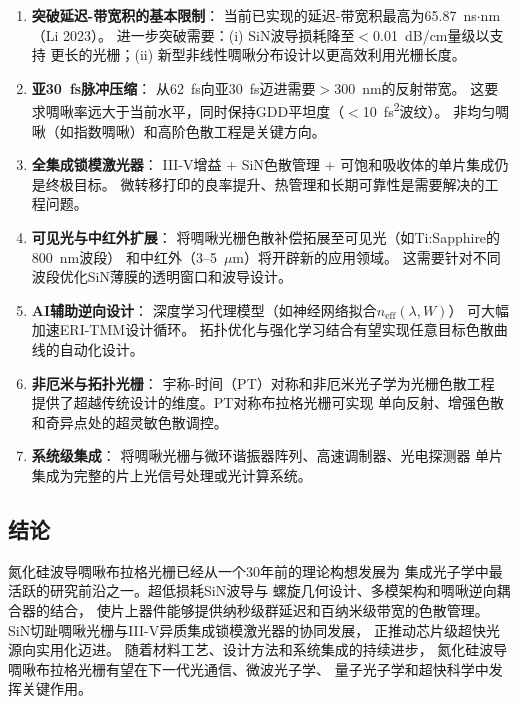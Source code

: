 \documentclass[12pt,a4paper,twoside]{article}
\begin{document}
\begin{enumerate}[leftmargin=*,itemsep=3pt]

\item \textbf{突破延迟-带宽积的基本限制}：
当前已实现的延迟-带宽积最高为65.87~ns$\cdot$nm（Li 2023）。
进一步突破需要：(i) SiN波导损耗降至$<$\SI{0.01}{dB/cm}量级以支持
更长的光栅；(ii) 新型非线性啁啾分布设计以更高效利用光栅长度。

\item \textbf{亚30~fs脉冲压缩}：
从62~fs向亚30~fs迈进需要$>$300~nm的反射带宽。
这要求啁啾率远大于当前水平，同时保持GDD平坦度（$<$\SI{10}{fs^2}波纹）。
非均匀啁啾（如指数啁啾）和高阶色散工程是关键方向。

\item \textbf{全集成锁模激光器}：
III-V增益 + SiN色散管理 + 可饱和吸收体的单片集成仍是终极目标。
微转移打印的良率提升、热管理和长期可靠性是需要解决的工程问题。

\item \textbf{可见光与中红外扩展}：
将啁啾光栅色散补偿拓展至可见光（如Ti:Sapphire的800~nm波段）
和中红外（3--5~$\mu$m）将开辟新的应用领域。
这需要针对不同波段优化SiN薄膜的透明窗口和波导设计。

\item \textbf{AI辅助逆向设计}：
深度学习代理模型（如神经网络拟合$n_{\text{eff}}(\lambda,W)$）
可大幅加速ERI-TMM设计循环。
拓扑优化与强化学习结合有望实现任意目标色散曲线的自动化设计。

\item \textbf{非厄米与拓扑光栅}：
宇称-时间（PT）对称和非厄米光子学为光栅色散工程
提供了超越传统设计的维度。PT对称布拉格光栅可实现
单向反射、增强色散和奇异点处的超灵敏色散调控。

\item \textbf{系统级集成}：
将啁啾光栅与微环谐振器阵列、高速调制器、光电探测器
单片集成为完整的片上光信号处理或光计算系统。

\end{enumerate}

\subsection{结论}

氮化硅波导啁啾布拉格光栅已经从一个30年前的理论构想发展为
集成光子学中最活跃的研究前沿之一。超低损耗SiN波导与
螺旋几何设计、多模架构和啁啾逆向耦合器的结合，
使片上器件能够提供纳秒级群延迟和百纳米级带宽的色散管理。
SiN切趾啁啾光栅与III-V异质集成锁模激光器的协同发展，
正推动芯片级超快光源向实用化迈进。
随着材料工艺、设计方法和系统集成的持续进步，
氮化硅波导啁啾布拉格光栅有望在下一代光通信、微波光子学、
量子光子学和超快科学中发挥关键作用。
\end{document}
